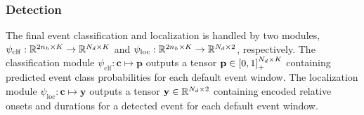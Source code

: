 \subsubsection{Detection}
The final event classification and localization is handled by two modules, \(\psi_{\mathrm{clf}} : \mathbb{R}^{2n_h \times K} \to \mathbb{R}^{N_d \times K}\) and \( \psi_{\mathrm{loc}} : \mathbb{R}^{2n_h \times K} \to \mathbb{R}^{N_d \times 2} \), respectively.
The classification module \(\psi_\text{clf} : \mathbf{c} \mapsto \mathbf{p}\) outputs a tensor \(\mathbf{p} \in \brackets*{0, 1}^{N_d \times K}_{+} \) containing predicted event class probabilities for each default event window.
The localization module \(\psi_\text{loc} : \mathbf{c} \mapsto \mathbf{y}\) outputs a tensor \(\mathbf{y} \in \mathbb{R}^{N_d \times 2}\) containing encoded relative onsets and durations for a detected event for each default event window.

